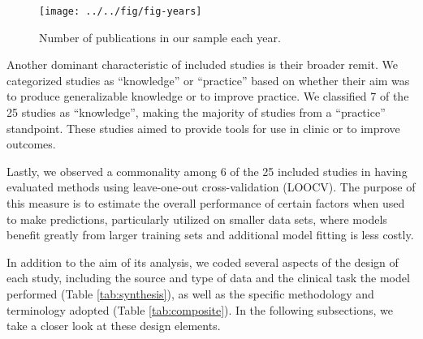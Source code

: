 \documentclass[preprint, 3p,
authoryear]{elsarticle} %
\begin{document}
\begin{figure}

{\centering \texttt{[image: ../../fig/fig-years]} 

}

\caption{Number of publications in our sample each year.}\label{fig:year}
\end{figure}

Another dominant characteristic of included studies is their broader
remit. We categorized studies as ``knowledge'' or ``practice'' based on
whether their aim was to produce generalizable knowledge or to improve
practice. We classified 7 of the 25 studies as ``knowledge'', making the
majority of studies from a ``practice'' standpoint. These studies aimed
to provide tools for use in clinic or to improve outcomes.

Lastly, we observed a commonality among 6 of the 25 included studies in
having evaluated methods using leave-one-out cross-validation (LOOCV).
The purpose of this measure is to estimate the overall performance of
certain factors when used to make predictions, particularly utilized on
smaller data sets, where models benefit greatly from larger training
sets and additional model fitting is less costly.

In addition to the aim of its analysis, we coded several aspects of the
design of each study, including the source and type of data and the
clinical task the model performed (Table \ref{tab:synthesis}), as well
as the specific methodology and terminology adopted (Table
\ref{tab:composite}). In the following subsections, we take a closer
look at these design elements.
\end{document}
